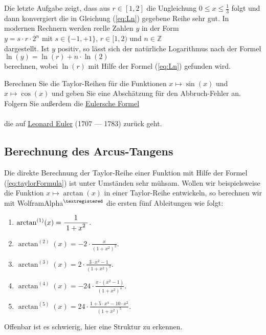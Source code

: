 Die letzte Aufgabe zeigt, dass aus $r \in [1,2]$ die Ungleichung $0 \leq x \leq \frac{1}{3}$ folgt
und dann konvergiert die in Gleichung (\ref{eq:Ln}) gegebene Reihe sehr 
gut.  In modernen Rechnern werden reelle Zahlen $y$ in der Form
\\[0.2cm]
\hspace*{1.3cm}
$y = s \cdot  r \cdot  2^n$ \quad mit $s\in\{-1,+1\}$, \quad $r \in [1,2)$ \quad und $n\in\mathbb{Z}$
\\[0.2cm]
dargestellt.  Ist $y$ positiv, so l\"asst sich der nat\"urliche Logarithmus nach der Formel 
\\[0.2cm]
\hspace*{1.3cm}
$\ln(y) = \ln(r) + n \cdot  \ln(2)$
\\[0.2cm]
berechnen, wobei $\ln(r)$ mit Hilfe der Formel (\ref{eq:Ln}) gefunden wird.

\exercise
 Berechnen Sie die Taylor-Reihen f\"ur die Funktionen $x \mapsto \sin(x)$ und $x \mapsto \cos(x)$
 und geben Sie eine Absch\"atzung f\"ur den Abbruch-Fehler an.  Folgern Sie au{\ss}erdem die
\href{http://de.wikipedia.org/wiki/Eulersche_Formel}{Eulersche Formel}
\\[0.2cm]
\hspace*{1.3cm}
\colorbox{red}{}
\\[0.2cm]
die auf 
\href{http://en.wikipedia.org/wiki/Leonard_Euler}{Leonard Euler} (1707 --- 1783) zur\"uck geht.
\eox


\subsection{Berechnung des Arcus-Tangens}
Die direkte Berechnung der Taylor-Reihe einer Funktion mit Hilfe der Formel
(\ref{eq:taylorFormula}) ist unter Umst\"anden sehr m\"uhsam.  Wollen wir beispielsweise die
Funktion $x \mapsto \arctan(x)$ in einer Taylor-Reihe entwickeln, so berechnen wir mit WolframAlpha$^{\scriptsize\textregistered}$ die
ersten f\"unf Ableitungen wie folgt:
\begin{enumerate}
\item $\arctan^{(1)}(x) = \displaystyle\frac{\;\displaystyle1\;}{\;\displaystyle1+{x}^{2}\;}$.
\item $\arctan^{(2)}(x) = \displaystyle -2 \cdot {\frac {x}{ \left( 1+{x}^{2} \right) ^{2}}}$.
\item $\arctan^{(3)}(x) = \displaystyle 2\cdot {\frac {3\cdot{x}^{2}-1}{ \left( 1+{x}^{2} \right)^{3}}}$.
\item $\arctan^{(4)}(x) = \displaystyle -24\cdot{\frac {x\cdot \left({x}^{2} - 1\right) }{ \left( 1+{x}^{2}
      \right)^{4}}}$.
\item $\arctan^{(5)}(x) = \displaystyle 24 \cdot{\frac {1+5\cdot{x}^{4}-10\cdot{x}^{2}}{ \left( 1+{x}^{2} \right)^{5}}}$.
\end{enumerate}
Offenbar ist es schwierig, hier eine Struktur zu erkennen.

